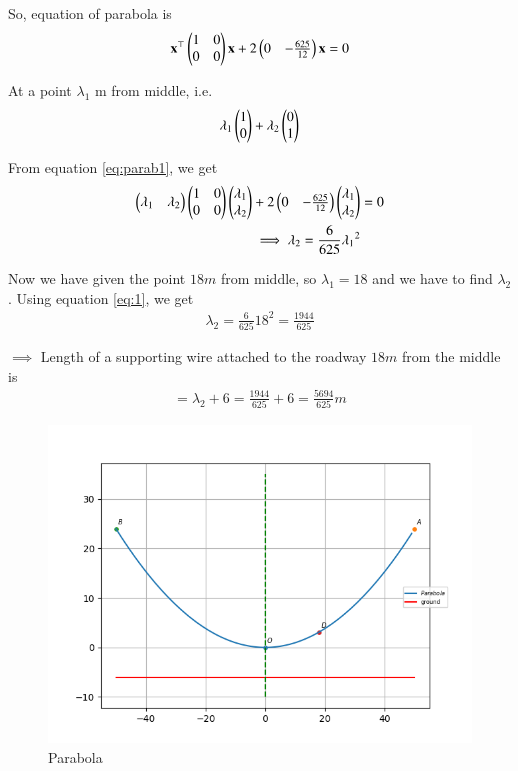 \documentclass[journal,12pt,twocolumn]{IEEEtran}
\renewcommand{\vec}[1]{\boldsymbol{\mathbf{#1}}}
\begin{document}
So, equation of parabola is
\begin{align}
    \label{eq:parab1}  \vec{x}^{\top}\myvec{1&0\\0&0}\vec{x} + 2\myvec{0&-\frac{625}{12}}\vec{x} = 0 
\end{align}

At a point $\lambda_1$ m from middle, i.e.
\begin{align}
    \lambda_1\begin{pmatrix}1\\0\end{pmatrix} + \lambda_2\begin{pmatrix}0\\1\end{pmatrix}
\end{align}

From equation \eqref{eq:parab1}, we get
\begin{align}
    \begin{pmatrix}\lambda_1&\lambda_2\end{pmatrix}\begin{pmatrix}1&0\\0&0\end{pmatrix}\begin{pmatrix}\lambda_1\\\lambda_2\end{pmatrix} + 2\begin{pmatrix}0 & -\frac{625}{12}\end{pmatrix}\begin{pmatrix}\lambda_1\\\lambda_2\end{pmatrix} &= 0\\
    \label{eq:1} \implies \lambda_2 = \frac{6}{625}{\lambda_1}^2
\end{align}

Now we have given the point $18 m$ from middle, so $\lambda_1 = 18$ and we have to find $\lambda_2$.
Using equation \eqref{eq:1}, we get
\begin{align}
    \lambda_2 = \frac{6}{625}{18}^2 = \frac{1944}{625}
\end{align}

$\implies$ Length of a supporting wire attached to the roadway $18 m$ from the middle is 
\begin{align}
    = \lambda_2 + 6 =  \frac{1944}{625} + 6 = \frac{5694}{625} m   
\end{align}

\begin{figure}[!htb]
    \centering
    \includegraphics[width=\columnwidth]{figs/parabola.png}
    \caption{Parabola}
    \label{fig:parabola}
\end{figure}
\end{document}
